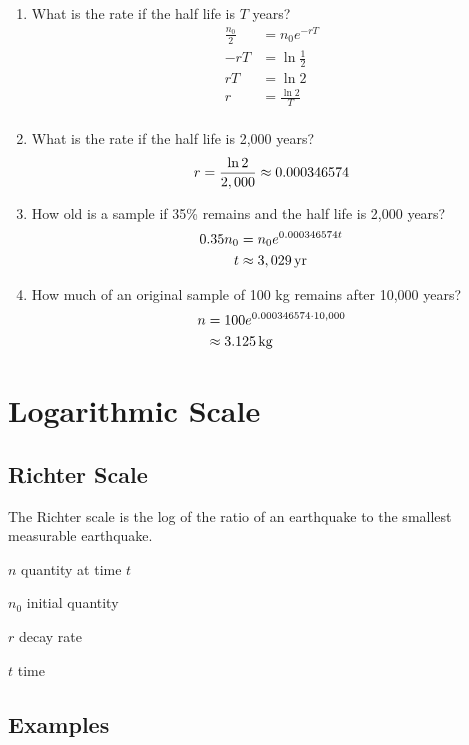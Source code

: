 \documentclass{exam}
\begin{document}
  \begin{enumerate}
    \item What is the rate if the half life is $T$ years?
      \begin{align*}
        \frac{n_0}{2} &= n_0 e^{-rT} \\
        -rT           &= \ln \frac{1}{2} \\
        rT            &= \ln 2 \\
        r             &= \frac{\ln 2}{T} \\
      \end{align*}

    \item What is the rate if the half life is 2,000 years?
      \[
        r = \frac{\ln 2}{2,000} \approx 0.000346574 \\
      \]

    \item How old is a sample if 35\% remains and the half life is 2,000 years?
      \begin{align*}
        0.35 n_0 & = n_0 e^{0.000346574 t} \\
        t        & \approx \unit[3,029]{yr} \\
      \end{align*}

    \item How much of an original sample of 100 kg remains after 10,000 years?
      \begin{align*}
        n & = 100 e^{0.000346574 \cdot 10,000} \\
          & \approx \unit[3.125]{kg} \\
      \end{align*}
  \end{enumerate}

  \section{Logarithmic Scale}

  \subsection{Richter Scale}
  The Richter scale is the log of the ratio of an earthquake to the smallest measurable earthquake.

  \begin{itemize*}
    \item $n$ quantity at time $t$
    \item $n_0$ initial quantity
    \item $r$ decay rate
    \item $t$ time
  \end{itemize*}

  \subsection{Examples}
\end{document}
